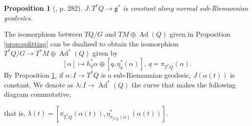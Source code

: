 \documentclass[12pt, letterpaper, reqno]{amsart}
\theoremstyle{definition}
\theoremstyle{plain}
\newtheorem{prop}{Proposition}
\theoremstyle{remark}
\begin{document}
\begin{prop}[\cite{montgomery2002tour}, p. 282]\label{prop:momentum_map}
	$ J: T^*Q \rightarrow \mathfrak{g}^* $ is constant along normal sub-Riemannian geodesics.
\end{prop}
The isomorphism between $ TQ/G $ and $ TM \oplus \operatorname{Ad} (Q) $ given in Proposition \ref{prop:splitting} can be dualized to obtain the isomorphism $ T^*Q/G \rightarrow T^*M \oplus \operatorname{Ad}^*(Q) $ given by
$$ \left[ \alpha \right] \mapsto h^*_q\alpha \oplus \left[ q, \eta_q^*(\alpha)\right], \ q=\pi_{T^*Q}(\alpha). $$ 
By Proposition \ref{prop:momentum_map}, if $ \alpha: I \rightarrow T^*Q $ is a sub-Riemannian geodesic, $ J(\alpha(t)) $ is constant. We denote as $ \lambda: I \rightarrow \operatorname{Ad}^*(Q) $ the curve that makes the following diagram commutative,
\begin{center}
\end{center}
that is, $ \lambda(t) = \left[ \pi_{T^*Q}(\alpha(t)), \eta^*_{\pi_{T^*Q}(\alpha)}(\alpha(t)) \right]  $. 
\end{document}
